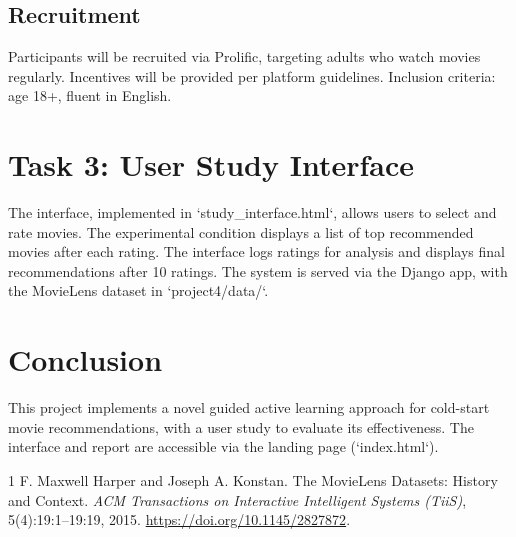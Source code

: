 \documentclass{article}
\begin{document}
\subsection{Recruitment}
Participants will be recruited via Prolific, targeting adults who watch movies regularly. Incentives will be provided per platform guidelines. Inclusion criteria: age 18+, fluent in English.

\section{Task 3: User Study Interface}
The interface, implemented in `study_interface.html`, allows users to select and rate movies. The experimental condition displays a list of top recommended movies after each rating. The interface logs ratings for analysis and displays final recommendations after 10 ratings. The system is served via the Django app, with the MovieLens dataset in `project4/data/`.

\section{Conclusion}
This project implements a novel guided active learning approach for cold-start movie recommendations, with a user study to evaluate its effectiveness. The interface and report are accessible via the landing page (`index.html`).



\begin{thebibliography}{1}
F. Maxwell Harper and Joseph A. Konstan.
The MovieLens Datasets: History and Context.
\textit{ACM Transactions on Interactive Intelligent Systems (TiiS)}, 5(4):19:1–19:19, 2015.
\url{https://doi.org/10.1145/2827872}.
\end{thebibliography}
\end{document}
